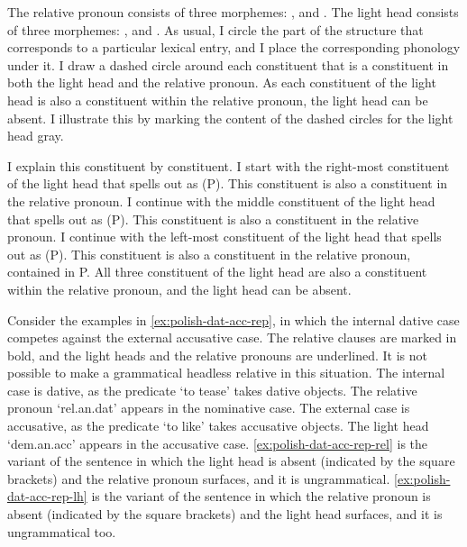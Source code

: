 The relative pronoun consists of three morphemes: ,  and .
The light head consists of three morphemes: ,  and .
As usual, I circle the part of the structure that corresponds to a particular lexical entry, and I place the corresponding phonology under it.
I draw a dashed circle around each constituent that is a constituent in both the light head and the relative pronoun.
As each constituent of the light head is also a constituent within the relative pronoun, the light head can be absent. I illustrate this by marking the content of the dashed circles for the light head gray.

I explain this constituent by constituent.
I start with the right-most constituent of the light head that spells out as  (P). This constituent is also a constituent in the relative pronoun.
I continue with the middle constituent of the light head that spells out as  (P). This constituent is also a constituent in the relative pronoun.
I continue with the left-most constituent of the light head that spells out as  (P). This constituent is also a constituent in the relative pronoun, contained in P.
All three constituent of the light head are also a constituent within the relative pronoun, and the light head can be absent.

Consider the examples in \ref{ex:polish-dat-acc-rep}, in which the internal dative case competes against the external accusative case. The relative clauses are marked in bold, and the light heads and the relative pronouns are underlined. It is not possible to make a grammatical headless relative in this situation.
The internal case is dative, as the predicate  `to tease' takes dative objects. The relative pronoun  `\ac{rel}.\ac{an}.\ac{dat}' appears in the nominative case.
The external case is accusative, as the predicate  `to like' takes accusative objects. The light head  `\ac{dem}.\ac{an}.\ac{acc}' appears in the accusative case.
\ref{ex:polish-dat-acc-rep-rel} is the variant of the sentence in which the light head is absent (indicated by the square brackets) and the relative pronoun surfaces, and it is ungrammatical.
\ref{ex:polish-dat-acc-rep-lh} is the variant of the sentence in which the relative pronoun is absent (indicated by the square brackets) and the light head surfaces, and it is ungrammatical too.

